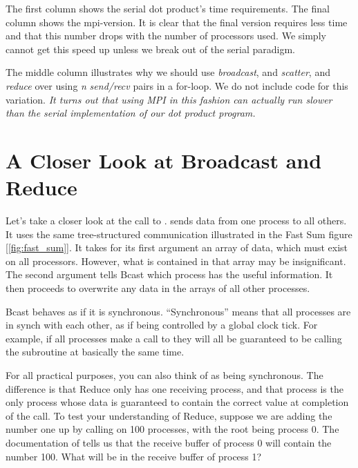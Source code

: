 

  The first column shows the serial dot product's time requirements. The final column shows the mpi-version. It is clear that the final version requires less time and that this number drops with the number of processors used. We simply cannot get this speed up unless we break out of the serial paradigm.

  The middle column illustrates why we should use \emph{broadcast}, and \emph{scatter}, and \emph{reduce} over using \emph{n} \emph{send/recv} pairs in a for-loop. We do not include code for this variation. \emph{It turns out that using MPI in this fashion can actually run slower than the serial implementation of our dot product program.}



\section*{A Closer Look at Broadcast and Reduce}
  Let's take a closer look at the call to .  sends data from one process to all others. It uses the same tree-structured communication illustrated in the Fast Sum figure [\ref{fig:fast_sum}]. It takes for its first argument an array of data, which must exist on all processors. However, what is contained in that array may be insignificant. The second argument tells Bcast which process has the useful information. It then proceeds to overwrite any data in the arrays of all other processes.

  Bcast behaves as if it is synchronous. ``Synchronous'' means that all processes are in synch with each other, as if being controlled by a global clock tick. For example, if all processes make a call to  they will all be guaranteed to be calling the subroutine at basically the same time.

  For all practical purposes, you can also think of  as being synchronous. The difference is that Reduce only has one receiving process, and that process is the only process whose data is guaranteed to contain the correct value at completion of the call. To test your understanding of Reduce, suppose we are adding the number one up by calling  on 100 processes, with the root being process 0. The documentation of  tells us that the receive buffer of process 0 will contain the number 100. What will be in the receive buffer of process 1?

